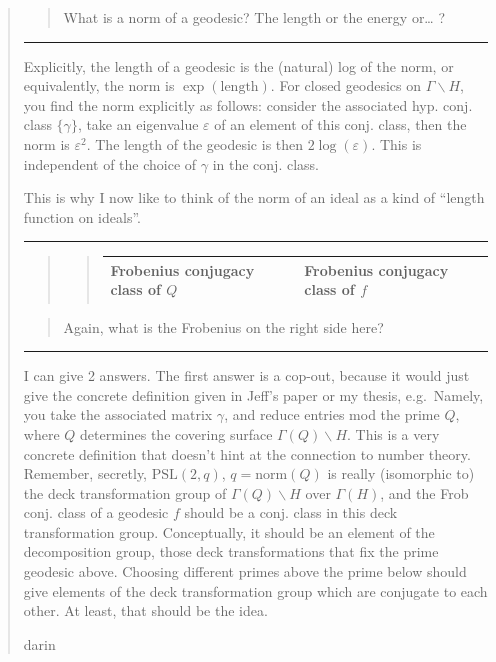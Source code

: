 \documentclass{article}
\begin{document}
\begin{quote}
\begin{quote}
What is a norm of a geodesic? The length or the energy or\ldots{} ?
\end{quote}

\begin{center}\rule{0.5\linewidth}{0.5pt}\end{center}

Explicitly, the length of a geodesic is the (natural) log of the norm,
or equivalently, the norm is \(\exp(\text{length})\). For closed
geodesics on \(\Gamma\backslash H\), you find the norm explicitly as
follows: consider the associated hyp. conj. class \(\{\gamma\}\), take
an eigenvalue \(\varepsilon\) of an element of this conj. class, then
the norm is \(\varepsilon^2\). The length of the geodesic is then
\(2\log(\varepsilon)\). This is independent of the choice of \(\gamma\)
in the conj. class.

This is why I now like to think of the norm of an ideal as a kind of
``length function on ideals''.

\begin{center}\rule{0.5\linewidth}{0.5pt}\end{center}

\begin{quote}
\begin{quote}
\begin{longtable}[]{@{}ll@{}}
\toprule
\endhead
Frobenius conjugacy class of \(Q\) & Frobenius conjugacy class of
\(f\)\tabularnewline
\bottomrule
\end{longtable}
\end{quote}
\end{quote}

\begin{quote}
Again, what is the Frobenius on the right side here?
\end{quote}

\begin{center}\rule{0.5\linewidth}{0.5pt}\end{center}

I can give 2 answers. The first answer is a cop-out, because it would
just give the concrete definition given in Jeff's paper or my thesis,
e.g.~Namely, you take the associated matrix \(\gamma\), and reduce
entries mod the prime \(Q\), where \(Q\) determines the covering surface
\(\Gamma(Q)\backslash H\). This is a very concrete definition that
doesn't hint at the connection to number theory. Remember, secretly,
\(\mathrm{PSL}(2,q)\), \(q = \mathrm{norm}(Q)\) is really (isomorphic
to) the deck transformation group of \(\Gamma(Q)\backslash H\) over
$\Gamma(H)$, and the Frob conj. class of a geodesic \(f\) should be a
conj. class in this deck transformation group. Conceptually, it should
be an element of the decomposition group, those deck transformations
that fix the prime geodesic above. Choosing different primes above the
prime below should give elements of the deck transformation group which
are conjugate to each other. At least, that should be the idea.

darin
\end{quote}
\end{document}
